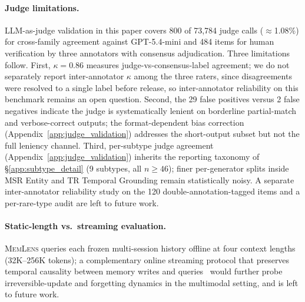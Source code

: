 \documentclass{article}
\newcommand{\bench}{\textsc{MemLens}}
\begin{document}
\paragraph{Judge limitations.}
LLM-as-judge validation in this paper covers 800 of 73{,}784 judge calls (${\approx}$1.08\%) for cross-family agreement against GPT-5.4-mini and 484 items for human verification by three annotators with consensus adjudication.
Three limitations follow.
First, $\kappa = 0.86$ measures judge-vs-consensus-label agreement; we do not separately report inter-annotator $\kappa$ among the three raters, since disagreements were resolved to a single label before release, so inter-annotator reliability on this benchmark remains an open question.
Second, the 29 false positives versus 2 false negatives indicate the judge is systematically lenient on borderline partial-match and verbose-correct outputs; the format-dependent bias correction (Appendix~\ref{app:judge_validation}) addresses the short-output subset but not the full leniency channel.
Third, per-subtype judge agreement (Appendix~\ref{app:judge_validation}) inherits the reporting taxonomy of \S\ref{app:subtype_detail} (9 subtypes, all $n \geq 46$); finer per-generator splits inside MSR Entity and TR Temporal Grounding remain statistically noisy.
A separate inter-annotator reliability study on the 120 double-annotation-tagged items and a per-rare-type audit are left to future work.

\paragraph{Static-length vs.\ streaming evaluation.}
\bench{} queries each frozen multi-session history offline at four context lengths (32K--256K tokens); a complementary online streaming protocol that preserves temporal causality between memory writes and queries~\cite{zheng2026lifedialbench} would further probe irreversible-update and forgetting dynamics in the multimodal setting, and is left to future work.
\end{document}
